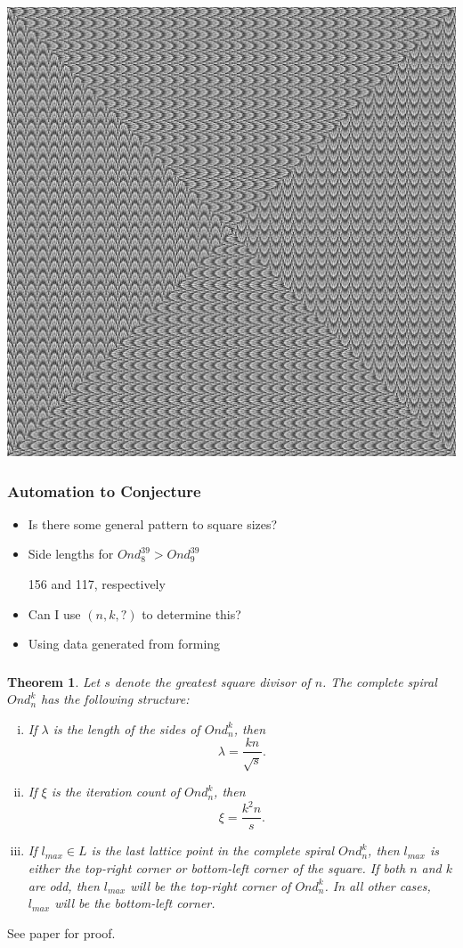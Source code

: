 \documentclass{beamer}
\theoremstyle{mydef}
\newtheorem{thm}{Theorem}[section]
\begin{document}
\frame
{
\includegraphics[scale=.25]{images/Ond-N31-k39.png}
}


\frame
{
  \frametitle{Automation to Conjecture}
  
  \begin{itemize}
  \item Is there some general pattern to square sizes?
  \item Side lengths for $Ond_8^{39} > Ond_9^{39}$
  
  156 and 117, respectively  
  \item Can I use $(n, k, ?)$ to determine this?
  \item Using data generated from forming 
  \end{itemize}
}

\frame
{
  \frametitle{}
  \begin{thm}%
\label{lenthm}
\footnotesize
Let $s$ denote the greatest square divisor of $n$.
The complete spiral $Ond^k_n$ has the following structure:
\begin{enumerate}[(i)]
\item If $\lambda$ is the length of the sides of $Ond^k_n$, then
\begin{equation}
  \lambda = \frac{kn}{\sqrt{s}}.
\label{lambda}
\end{equation}
\item If $\xi$ is the iteration count of $Ond^k_n$, then
\begin{equation}
  \xi = \frac{k^2n}{s}.  
\label{xi}
\end{equation}
\item If $l_{max} \in L$ is the last lattice point in the complete
  spiral $Ond^k_n$, then $l_{max}$ is either the top-right corner or
  bottom-left corner of the square.  If both $n$ and $k$ are odd, then
  $l_{max}$ will be the top-right corner of $Ond^k_n$.  In all other
  cases, $l_{max}$ will be the bottom-left corner.
\end{enumerate}
\end{thm}
See paper for proof.
}
\end{document}
